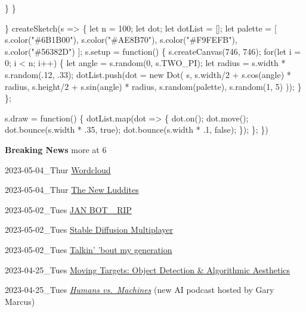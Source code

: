 \documentclass[
  letterpaper,
  DIV=11,
  numbers=noendperiod]{scrartcl}
\newenvironment{Shaded}{\begin{snugshade}}{\end{snugshade}}
\newcommand{\NormalTok}[1]{\textcolor[rgb]{0.00,0.23,0.31}{#1}}
\begin{document}
\begin{Shaded}
\begin{Highlighting}[]
\NormalTok{    \}}
\NormalTok{  \}}
  
\NormalTok{\}}
\NormalTok{createSketch(s =\textgreater{} \{}
\NormalTok{  let n = 100;}
\NormalTok{  let dot;}
\NormalTok{  let dotList = [];}
\NormalTok{  let palette = [}
\NormalTok{    s.color("\#6B1B00"),}
\NormalTok{    s.color("\#AE8B70"),}
\NormalTok{    s.color("\#F9FEFB"),}
\NormalTok{    s.color("\#56382D") }
\NormalTok{  ];}
\NormalTok{  s.setup = function() \{}
\NormalTok{    s.createCanvas(746, 746);}
\NormalTok{    for(let i = 0; i \textless{} n; i++) \{}
\NormalTok{      let angle = s.random(0, s.TWO\_PI);}
\NormalTok{      let radius = s.width * s.random(.12, .33);}
\NormalTok{      dotList.push(dot = new Dot(}
\NormalTok{        s,}
\NormalTok{        s.width/2 + s.cos(angle) * radius,}
\NormalTok{        s.height/2 + s.sin(angle) * radius,}
\NormalTok{        s.random(palette),}
\NormalTok{        s.random(1, 5)}
\NormalTok{      ));}
\NormalTok{    \}}
\NormalTok{  \};}
    
\NormalTok{  s.draw = function() \{}
\NormalTok{    dotList.map(dot =\textgreater{} \{}
\NormalTok{      dot.on();}
\NormalTok{      dot.move();}
\NormalTok{      dot.bounce(s.width * .35, true);}
\NormalTok{      dot.bounce(s.width * .1, false);}
\NormalTok{    \});}
\NormalTok{  \};}
\NormalTok{\})}
\end{Highlighting}
\end{Shaded}

\textbf{Breaking News} more at 6

2023-05-04\_Thur
\href{https://mroberts1.github.io/wordcloud/}{Wordcloud}

2023-05-04\_Thur
\href{https://www.politico.eu/article/artificial-intelligence-technology-art-regulation-copyright/}{The
New Luddites}

2023-05-02\_Tues \href{https://jan.bot/livelog}{JAN BOT\_ RIP}

2023-05-02\_Tues
\href{https://huggingface.co/spaces/huggingface-projects/stable-diffusion-multiplayer}{Stable
Diffusion Multiplayer}

2023-05-02\_Tues
\href{https://www.youtube.com/watch?v=PJlvf5rM3Hg}{Talkin' 'bout my
generation}

2023-04-25\_Tues
\href{https://dokoissho.sdf.org/conferences/moving-targets/}{Moving
Targets: Object Detection \& Algorithmic Aesthetics}

2023-04-25\_Tues
\href{https://podcasts.apple.com/us/podcast/humans-vs-machines-with-gary-marcus/id1532110146}{\emph{Humans
vs.~Machines}} (new AI podcast hosted by Gary Marcus)
\end{document}
